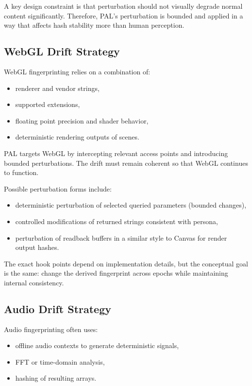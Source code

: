 \documentclass[11pt]{report}
\begin{document}
A key design constraint is that perturbation should not visually degrade normal content significantly. Therefore, PAL’s perturbation is bounded and applied in a way that affects hash stability more than human perception.

\subsection{WebGL Drift Strategy}

WebGL fingerprinting relies on a combination of:
\begin{itemize}
    \item renderer and vendor strings,
    \item supported extensions,
    \item floating point precision and shader behavior,
    \item deterministic rendering outputs of scenes.
\end{itemize}

PAL targets WebGL by intercepting relevant access points and introducing bounded perturbations. The drift must remain coherent so that WebGL continues to function.

Possible perturbation forms include:
\begin{itemize}
    \item deterministic perturbation of selected queried parameters (bounded changes),
    \item controlled modifications of returned strings consistent with persona,
    \item perturbation of readback buffers in a similar style to Canvas for render output hashes.
\end{itemize}

The exact hook points depend on implementation details, but the conceptual goal is the same: change the derived fingerprint across epochs while maintaining internal consistency.

\subsection{Audio Drift Strategy}

Audio fingerprinting often uses:
\begin{itemize}
    \item offline audio contexts to generate deterministic signals,
    \item FFT or time-domain analysis,
    \item hashing of resulting arrays.
\end{itemize}
\end{document}
